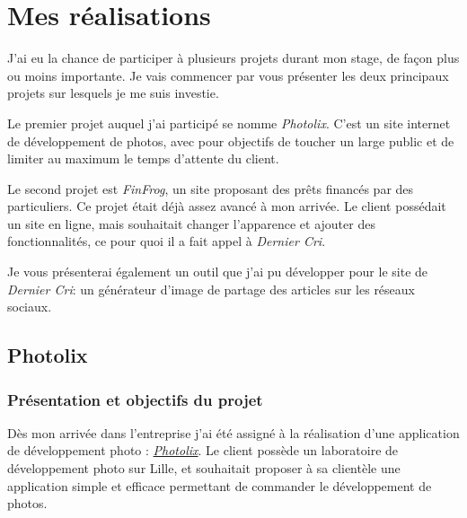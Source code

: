 \documentclass[12pt,a4paper]{article}
\begin{document}
  \newpage

  \section{Mes réalisations}\label{mes-ruxe9alisations}

  \bigskip

  J'ai eu la chance de participer à plusieurs projets durant mon stage, de
  façon plus ou moins importante. Je vais commencer par vous présenter les
  deux principaux projets sur lesquels je me suis investie.

  \bigskip

  Le premier projet auquel j'ai participé se nomme \emph{Photolix}. C'est
  un site internet de développement de photos, avec pour objectifs de
  toucher un large public et de limiter au maximum le temps d'attente du
  client.

  \bigskip

  Le second projet est \emph{FinFrog}, un site proposant des prêts
  financés par des particuliers. Ce projet était déjà assez avancé à mon
  arrivée. Le client possédait un site en ligne, mais souhaitait changer
  l'apparence et ajouter des fonctionnalités, ce pour quoi il a fait appel
  à \emph{Dernier Cri}.

  \bigskip

  Je vous présenterai également un outil que j'ai pu développer pour le
  site de \emph{Dernier Cri}: un générateur d'image de partage des
  articles sur les réseaux sociaux.

  \bigskip

  \subsection{Photolix}\label{photolix}

  \subsubsection{Présentation et objectifs du
  projet}\label{pruxe9sentation-et-objectifs-du-projet}

  \bigskip

  Dès mon arrivée dans l'entreprise j'ai été assigné à la réalisation
  d'une application de développement photo :
  \href{https://app.photolix.fr/}{\emph{Photolix}}. Le client possède un
  laboratoire de développement photo sur Lille, et souhaitait proposer à
  sa clientèle une application simple et efficace permettant de commander
  le développement de photos.
\end{document}
